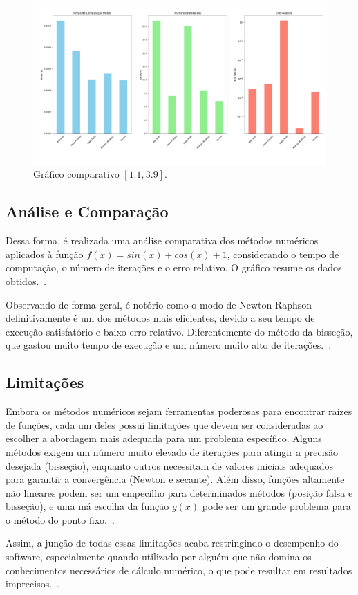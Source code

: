 \begin{figure}[htbp]
	\centering
	\setlength{\fboxsep}{0pt}
	\includegraphics[width=\textwidth]{./fig/benchmark.png}
	\caption{Gráfico comparativo $[1.1, 3.9]$.}
	\label{fig:grafico-comp}
\end{figure}

\subsection{\textbf{Análise e Comparação}}

Dessa forma, é realizada uma análise comparativa dos métodos numéricos aplicados
à função $f(x) = sin(x) + cos(x) + 1$, considerando o tempo de computação, o
número de iterações e o erro relativo. O gráfico resume os dados
obtidos.\cite{ruggiero1996calculo}~\cite{asano2009calculo}.

Observando de forma geral, é notório como o modo de Newton-Raphson
definitivamente é um dos métodos mais eficientes, devido a seu tempo de execução
satisfatório e baixo erro relativo. Diferentemente do método da bisseção, que
gastou muito tempo de execução e um número muito alto de
iterações.\cite{dequadros2009fundamentos}~\cite{moreira2011curso}.

\subsection{\textbf{Limitações}}

Embora os métodos numéricos sejam ferramentas poderosas para encontrar raízes de
funções, cada um deles possui limitações que devem ser consideradas ao escolher
a abordagem mais adequada para um problema específico. Alguns métodos exigem um
número muito elevado de iterações para atingir a precisão desejada (bisseção),
enquanto outros necessitam de valores iniciais adequados para garantir a
convergência (Newton e secante). Além disso, funções altamente não lineares
podem ser um empecilho para determinados métodos (posição falsa e bisseção), e
uma má escolha da função $g(x)$ pode ser um grande problema para o método do
ponto fixo.\cite{marins1996localizacao}~\cite{lobao_introducao}.

Assim, a junção de todas essas limitações acaba restringindo o desempenho do
software, especialmente quando utilizado por alguém que não domina os
conhecimentos necessários de cálculo numérico, o que pode resultar em resultados
imprecisos.\cite{anton2014calculo}~\cite{bartle1983elementos}.
